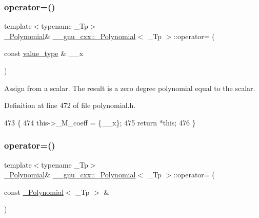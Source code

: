 \subsubsection{\texorpdfstring{operator=()}{operator=()}\hspace{0.1cm}{\footnotesize\ttfamily [1/4]}}
{\footnotesize\ttfamily template$<$typename \+\_\+\+Tp$>$ \\
\hyperlink{class____gnu__cxx_1_1__Polynomial}{\+\_\+\+Polynomial}\& \hyperlink{class____gnu__cxx_1_1__Polynomial}{\+\_\+\+\_\+gnu\+\_\+cxx\+::\+\_\+\+Polynomial}$<$ \+\_\+\+Tp $>$\+::operator= (\begin{DoxyParamCaption}\item[{const \hyperlink{class____gnu__cxx_1_1__Polynomial_a725563351f50e76084a7a016c06f8a53}{value\+\_\+type} \&}]{\+\_\+\+\_\+x }\end{DoxyParamCaption})\hspace{0.3cm}{\ttfamily [inline]}}

Assign from a scalar. The result is a zero degree polynomial equal to the scalar. 

Definition at line 472 of file polynomial.\+h.


\begin{DoxyCode}
473       \{
474         this->\_M\_coeff = \{\_\_x\};
475         \textcolor{keywordflow}{return} *\textcolor{keyword}{this};
476       \}
\end{DoxyCode}
\mbox{\label{class____gnu__cxx_1_1__Polynomial_a96aa1f47da636376d63cf099558113b8}} 
\subsubsection{\texorpdfstring{operator=()}{operator=()}\hspace{0.1cm}{\footnotesize\ttfamily [2/4]}}
{\footnotesize\ttfamily template$<$typename \+\_\+\+Tp$>$ \\
\hyperlink{class____gnu__cxx_1_1__Polynomial}{\+\_\+\+Polynomial}\& \hyperlink{class____gnu__cxx_1_1__Polynomial}{\+\_\+\+\_\+gnu\+\_\+cxx\+::\+\_\+\+Polynomial}$<$ \+\_\+\+Tp $>$\+::operator= (\begin{DoxyParamCaption}\item[{const \hyperlink{class____gnu__cxx_1_1__Polynomial}{\+\_\+\+Polynomial}$<$ \+\_\+\+Tp $>$ \&}]{ }\end{DoxyParamCaption})\hspace{0.3cm}{\ttfamily [default]}}

